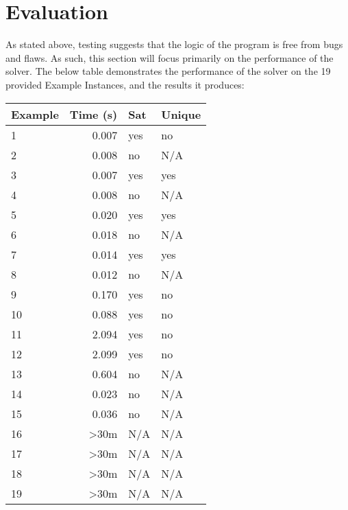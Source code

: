 \documentclass[11pt]{article}
\begin{document}
	\section{Evaluation}

		As stated above, testing suggests that the logic of the program is free from bugs and flaws.
		As such, this section will focus primarily on the performance of the solver.
		The below table demonstrates the performance of the solver on the 19 provided Example Instances,
		and the results it produces:

		\begin{table}[htb]
			\begin{tabular}{|l|l|l|l|}
			\hline
			\textbf{Example} & \textbf{Time (s)}          & \textbf{Sat} & \textbf{Unique} \\ \hline
			1                & \multicolumn{1}{r|}{0.007} & yes          & no              \\
			2				 & \multicolumn{1}{r|}{0.008} & no           & N/A             \\
			3				 & \multicolumn{1}{r|}{0.007} & yes          & yes             \\
			4				 & \multicolumn{1}{r|}{0.008} & no           & N/A             \\
			5				 & \multicolumn{1}{r|}{0.020} & yes          & yes             \\
			6				 & \multicolumn{1}{r|}{0.018} & no           & N/A             \\
			7				 & \multicolumn{1}{r|}{0.014} & yes          & yes             \\
			8				 & \multicolumn{1}{r|}{0.012} & no           & N/A             \\
			9				 & \multicolumn{1}{r|}{0.170} & yes          & no              \\
			10				 & \multicolumn{1}{r|}{0.088} & yes          & no              \\
			11				 & \multicolumn{1}{r|}{2.094} & yes          & no              \\
			12				 & \multicolumn{1}{r|}{2.099} & yes          & no              \\
			13				 & \multicolumn{1}{r|}{0.604} & no           & N/A             \\
			14				 & \multicolumn{1}{r|}{0.023} & no           & N/A             \\
			15				 & \multicolumn{1}{r|}{0.036} & no           & N/A             \\
			16				 & \multicolumn{1}{r|}{\textgreater{}30m} & N/A  & N/A         \\
			17				 & \multicolumn{1}{r|}{\textgreater{}30m} & N/A  & N/A         \\
			18				 & \multicolumn{1}{r|}{\textgreater{}30m} & N/A  & N/A         \\
			19				 & \multicolumn{1}{r|}{\textgreater{}30m} & N/A  & N/A         \\
			\end{tabular}
		\end{table}
\end{document}
